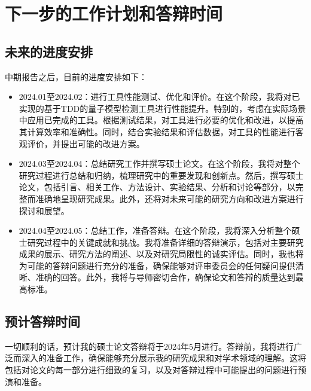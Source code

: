 \section{下一步的工作计划和答辩时间}
\subsection{未来的进度安排}
中期报告之后，目前的进度安排如下： 
\begin{itemize}
    \item 2024.01至2024.02：进行工具性能测试、优化和评价。在这个阶段，我将对已实现的基于TDD的量子模型检测工具进行性能提升。特别的，考虑在实际场景中应用已完成的工具。根据测试结果，对工具进行必要的优化和改进，以提高其计算效率和准确性。同时，结合实验结果和评估数据，对工具的性能进行客观评价，并提出可能的改进方案。
    \item 2024.03至2024.04：总结研究工作并撰写硕士论文。在这个阶段，我将对整个研究过程进行总结和归纳，梳理研究中的重要发现和创新点。然后，撰写硕士论文，包括引言、相关工作、方法设计、实验结果、分析和讨论等部分，以完整而准确地呈现研究成果。此外，还将对未来可能的研究方向和改进方案进行探讨和展望。
    \item 2024.04至2024.05：总结工作，准备答辩。在这个阶段，我将深入分析整个硕士研究过程中的关键成就和挑战。我将准备详细的答辩演示，包括对主要研究成果的展示、研究方法的阐述、以及对研究局限性的诚实评估。同时，我也将为可能的答辩问题进行充分的准备，确保能够对评审委员会的任何疑问提供清晰、准确的回答。此外，我将与导师密切合作，确保论文和答辩的质量达到最高标准。
\end{itemize}
\subsection{预计答辩时间}
一切顺利的话，预计我的硕士论文答辩将于2024年5月进行。答辩前，我将进行广泛而深入的准备工作，确保能够充分展示我的研究成果和对学术领域的理解。这将包括对论文的每一部分进行细致的复习，以及对答辩过程中可能提出的问题进行预演和准备。